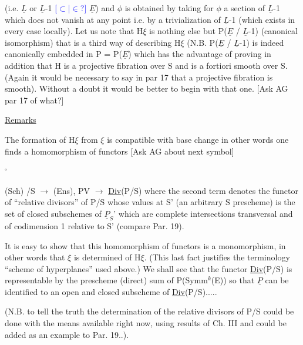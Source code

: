 \documentclass[11pt]{article}
\newcommand{\scanpage}[1]{\par\bigskip\noindent{\small\sffamily[scan #1]}\par}
\newcommand{\mspage}[1]{{\small\sffamily[p.\,#1]}}
\newcommand{\hand}[1]{\textcolor{blue}{#1}}
\newcommand{\uline}[1]{\underline{#1}}
\newcommand{\unsure}[1]{[#1?]}
\begin{document}
(i.e. $\underline{L}$ or $\underline{L}$-1 \hand{\unsure{$\subset$|$\in$}} $\underline{E}$) and $\phi$ is obtained by taking for $\phi$ a
section of $\underline{L}$-1 which does not vanish at any point i.e. by a
trivialization of $\underline{L}$-1 (which exists in every case locally). Let us
note that H$\xi$ is nothing else but P($\underline{E}$ / $\underline{L}$-1) (canonical isomorphism)
that is a third way of describing H$\xi$ (N.B. P($\underline{E}$ / $\underline{L}$-1) is indeed
canonically embedded in P = P($\underline{E}$) which has the advantage of
proving in addition that H is a projective fibration over S and is
a fortiori smooth over S. (Again it would be necessary to say in
par 17 that a projective fibration is smooth). Without a doubt it
would be better to begin with that one. [Ask AG par 17 of what?]

\uline{Remarks}

The formation of H$\xi$ from $\xi$ is compatible with base change in
other words one finds a homomorphism of functors [Ask AG about
next symbol]

\quad $^{\circ}$

(Sch) /S $\rightarrow$ (Ens), PV $\rightarrow$ \uline{Div}(P/S) where the second term denotes the
functor of ``relative divisors'' of P/S whose values at S' (an
arbitrary S prescheme) is the set of closed subschemes of $\underline{P}_{S}$' which
are complete intersections transversal and of codimension 1
relative to S' (compare Par. 19).

It is easy to show that this homomorphism of functors is a
monomorphism, in other words that $\xi$ is determined of H$\xi$. (This
last fact justifies the terminology ``scheme of hyperplanes'' used
above.) We shall see that the functor \uline{Div}(P/S) is representable
by the prescheme (direct) sum of P(Symm$^{k}$(E)) so that $\underline{P}$ can be
identified to an open and closed subscheme of \uline{Div}(P/S).....

\clearpage
\scanpage{24/6}
\mspage{6}

(N.B. to tell the truth the determination of the relative divisors
of P/S could be done with the means available right now, using
results of Ch. III and could be added as an example to Par. 19..).
\end{document}

